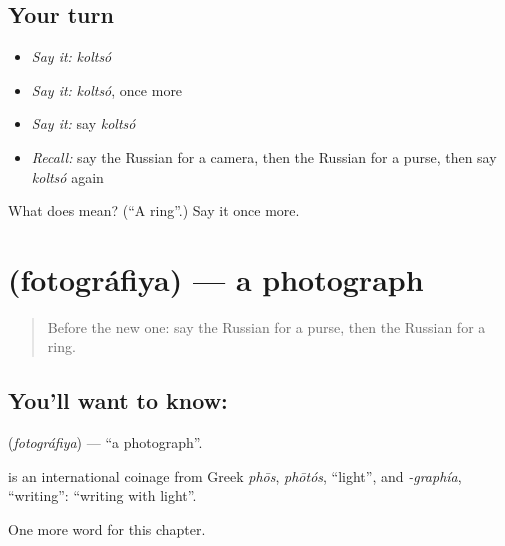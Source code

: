 \subsection*{Your turn}
\begin{itemize}
\raggedright
  \item \emph{Say it:} \emph{koltsó}
  \item \emph{Say it:} \emph{koltsó}, once more
  \item \emph{Say it:} say \emph{koltsó}
  \item \emph{Recall:} say the Russian for a camera, then the Russian for a purse, then say \emph{koltsó} again
\end{itemize}

\begin{tcolorbox}[breakable,colback=teal!4,colframe=teal!35!black,title={Before you move on}]
What does  mean? (\textquotedblleft{}A ring\textquotedblright{}.) Say it once more.
\end{tcolorbox}
\section[\texorpdfstring{\ru{фотография} (fotográfiya)}{фотография (fotográfiya)}]{ (fotográfiya) — a photograph}

\label{lesson:RU-C100-photograph}



\begin{quote}
Before the new one: say the Russian for a purse, then the Russian for a ring.
\end{quote}

\subsection*{You'll want to know: }
\textbf{} (\emph{fotográfiya}) — \textquotedblleft{}a photograph\textquotedblright{}.

\begin{cousinweb}
\textbf{} is an international coinage from Greek \emph{phōs}, \emph{phōtós}, \textquotedblleft{}light\textquotedblright{}, and \emph{-graphía}, \textquotedblleft{}writing\textquotedblright{}: \textquotedblleft{}writing with light\textquotedblright{}.
\end{cousinweb}

\begin{grammarlens}[title={What you've built}]
One more word for this chapter.
\end{grammarlens}

